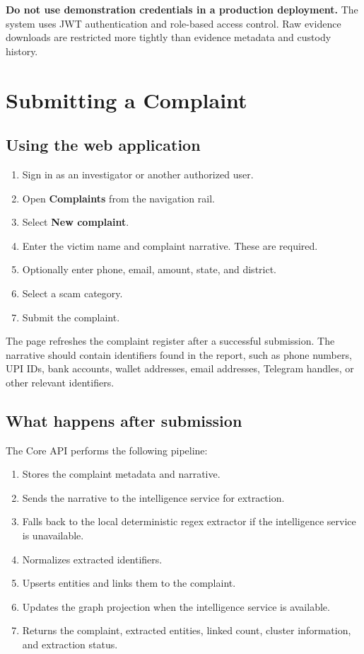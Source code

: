 \documentclass[11pt,a4paper]{article}
\newcommand{\important}[1]{\textbf{#1}}
\begin{document}
\important{Do not use demonstration credentials in a production deployment.} The system uses JWT authentication and role-based access control. Raw evidence downloads are restricted more tightly than evidence metadata and custody history.

\section{Submitting a Complaint}

\subsection{Using the web application}

\begin{enumerate}[leftmargin=*]
  \item Sign in as an investigator or another authorized user.
  \item Open \textbf{Complaints} from the navigation rail.
  \item Select \textbf{New complaint}.
  \item Enter the victim name and complaint narrative. These are required.
  \item Optionally enter phone, email, amount, state, and district.
  \item Select a scam category.
  \item Submit the complaint.
\end{enumerate}

The page refreshes the complaint register after a successful submission. The narrative should contain identifiers found in the report, such as phone numbers, UPI IDs, bank accounts, wallet addresses, email addresses, Telegram handles, or other relevant identifiers.

\subsection{What happens after submission}

The Core API performs the following pipeline:

\begin{enumerate}[leftmargin=*]
  \item Stores the complaint metadata and narrative.
  \item Sends the narrative to the intelligence service for extraction.
  \item Falls back to the local deterministic regex extractor if the intelligence service is unavailable.
  \item Normalizes extracted identifiers.
  \item Upserts entities and links them to the complaint.
  \item Updates the graph projection when the intelligence service is available.
  \item Returns the complaint, extracted entities, linked count, cluster information, and extraction status.
\end{enumerate}
\end{document}
